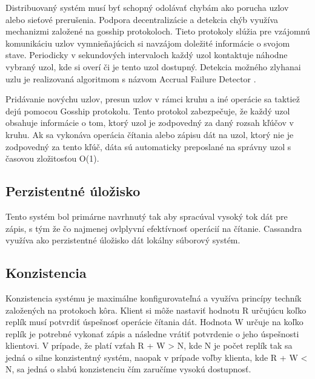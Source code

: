 \documentclass[11pt,twoside,a4paper]{book}
\begin{document}
Distribuovaný systém musí byť schopný odolávať chybám ako porucha uzlov alebo sieťové prerušenia. Podpora decentralizácie a detekcia chýb využíva mechanizmi založené na gosship protokoloch. Tieto protokoly slúžia pre vzájomnú komunikáciu uzlov vymnieňajúcich si navzájom doležité informácie o svojom stave. Periodicky v sekundových intervaloch každý uzol kontaktuje náhodne vybraný uzol, kde si overí či je tento uzol dostupný. Detekcia možného zlyhanai uzlu je realizovaná algoritmom s názvom Accrual Failure Detector \cite{accrualdetector}.

Pridávanie novýchu uzlov, presun uzlov v rámci kruhu a iné operácie sa taktiež dejú pomocou Gosship protokolu. Tento protokol zabezpečuje, že každý uzol obsahuje informácie o tom, ktorý uzol je zodpovedný za daný rozsah kľúčov v kruhu. Ak sa vykonáva operácia čítania alebo zápisu dát na uzol, ktorý nie je zodpovedný za tento kľúč, dáta sú automaticky preposlané na správny uzol s časovou zložitosťou O(1).

\subsection{Perzistentné úložisko}

Tento systém bol primárne navrhnutý tak aby spracúval vysoký tok dát pre zápis, s tým že čo najmenej ovlplyvní efektívnosť operácií na čítanie. Cassandra využíva ako perzistentné úložisko dát lokálny súborový systém. 

\subsection{Konzistencia}

Konzistencia systému je maximálne konfigurovateľná a využíva princípy techník založených na protokoch kôra. Klient si môže nastaviť hodnotu R určujúcu koľko replík musí potvrdiť úspešnosť operácie čítania dát. Hodnota W určuje na koľko replík je potrebné vykonať zápis a následne vrátiť potvrdenie o jeho úspešnosti klientovi. V prípade, že platí vzťah R + W > N, kde N je počet replík tak sa jedná o silne konzistentný systém, naopak v prípade voľby klienta, kde R + W < N, sa jedná o slabú konzistenciu čím zaručíme vysokú dostupnosť.
\end{document}
